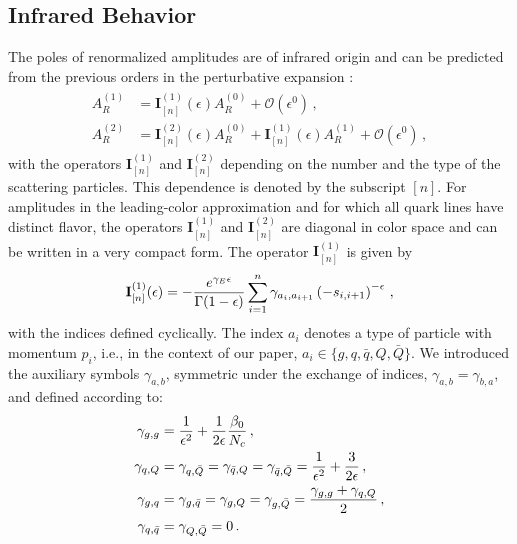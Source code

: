 \subsection{Infrared Behavior}

The poles of renormalized amplitudes are of infrared origin and
can be predicted from the previous orders in the perturbative 
expansion 
\cite{Catani:1998bh,Sterman:2002qn,Becher:2009cu,Gardi:2009qi}:
\begin{align}
  \begin{split}\label{eq:catani}
    A_R^{(1)}&=\mathbf{I}^{(1)}_{[n]}(\epsilon)
    A_R^{(0)}+\mathcal{O}
    (\epsilon^0)\,,\\
    A_R^{(2)}&=\mathbf{I}^{(2)}_{[n]}(\epsilon)A_R^{(0)}+\mathbf{I}^{(1)}_{[n]}(\epsilon)
    A_R^{(1)}+\mathcal{O}(\epsilon^0)\,,
  \end{split}
\end{align}
with the operators $\mathbf{I}^{(1)}_{[n]}$ and
$\mathbf{I}^{(2)}_{[n]}$ depending on the number and the type of
the scattering particles. This dependence is denoted by the 
subscript $[n]$.
For amplitudes in the leading-color approximation and for which
all quark lines have distinct flavor, the operators
$\mathbf{I}^{(1)}_{[n]}$ and $\mathbf{I}^{(2)}_{[n]}$ are 
diagonal in color space and can be written in a very compact
form. The operator $\mathbf{I}^{(1)}_{[n]}$ is given by
%
\begin{equation}
  \mathbf{I}^{(1)}_{[n]}(\epsilon)=-\frac{e^{\gamma_E\epsilon}}{\Gamma(1-\epsilon)}
  \sum_{i=1}^n\gamma_{a_i,a_{i+1}}
  \left( -s_{i,i+1}\right)^{-\epsilon}\,,
\end{equation}
with the indices defined cyclically.
The index $a_i$ denotes a type of particle with momentum $p_i$, i.e., in the context of our paper,
$a_i\in\{g,q,\bar q, Q, \bar Q\}$. We introduced the auxiliary symbols $\gamma_{a,b}$, 
symmetric under the exchange of indices, 
$\gamma_{a,b}=\gamma_{b,a}$, and defined according to:
\begin{align}
  \begin{split}
    \gamma_{g,g}&=\frac{1}{\epsilon^2}+\frac{1}{2\epsilon}
    \frac{\beta_0}{{N_c}}\,, \\
    \gamma_{q,Q}&=\gamma_{q,\bar Q}=
    \gamma_{\bar q, Q}=\gamma_{\bar q, \bar Q} 
    =\frac{1}{\epsilon^2}+\frac{3}{2\epsilon}\,,\\
    \gamma_{g,q}&=\gamma_{g,\bar q}=
    \gamma_{g,Q}=\gamma_{g,\bar Q}=
    \frac{\gamma_{g,g}+\gamma_{q,Q}}{2}\,,\\
    \gamma_{q,\bar q}&=\gamma_{Q,\bar Q}=0\,.
  \end{split}
\end{align}

